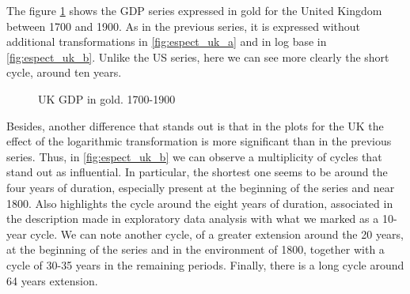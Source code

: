 \documentclass[a4paper,10cpi]{article}
\begin{document}
	The figure \ref{fig:espect_uk} shows the GDP series expressed in gold for the United Kingdom between 1700 and 1900. As in the previous series, it is expressed without additional transformations in \ref{fig:espect_uk_a} and in log base in \ref{fig:espect_uk_b}. Unlike the US series, here we can see more clearly the short cycle, around ten years.
	
	\begin{figure}[H]
		\centering
		\caption{UK GDP in gold. 1700-1900} \label{fig:espect_uk}
	\end{figure}
	
	Besides, another difference that stands out is that in the plots for the UK the effect of the logarithmic transformation is more significant than in the previous series. Thus, in \ref {fig:espect_uk_b} we can observe a multiplicity of cycles that stand out as influential. In particular, the shortest one seems to be around the four years of duration, especially present at the beginning of the series and near 1800. Also highlights the cycle around the eight years of duration, associated in the description made in exploratory data analysis with what we marked as a 10-year cycle. We can note another cycle, of a greater extension around the 20 years, at the beginning of the series and in the environment of 1800, together with a cycle of 30-35 years in the remaining periods. Finally, there is a long cycle around 64 years extension.
	
\end{document}
